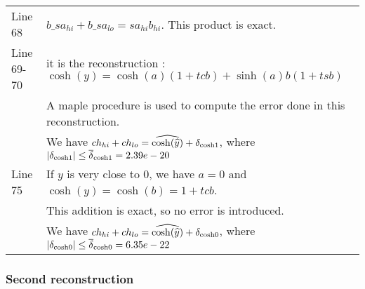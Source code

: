 \begin{tabular}{ll}
Line 68    & $b\_sa_{hi} + b\_sa_{lo} = sa_{hi}  b_{hi}$. This product is exact. \\
Line 69-70 & it is the reconstruction : $\cosh(y) = \cosh(a)(1+tcb) + \sinh(a)b(1+tsb)$ \\
           & A maple procedure is used to compute the error done in this reconstruction. \\
           & We have $ch_{hi}+ch_{lo} = \widehat{\cosh(\widehat{y})} + \delta_{\mathrm{cosh1}}$, where $|\delta_{\mathrm{cosh1}}| \leq {\overline{\delta}}_{\mathrm{cosh1}} = 2.39e-20$\\
Line 75    & If $y$ is very close to $0$, we have $a = 0$ and $\cosh(y) = \cosh(b) = 1 + tcb$. \\
           & This addition is exact, so no error is introduced. \\
           & We have $ch_{hi}+ch_{lo} = \widehat{\cosh(\widehat{y})} + \delta_{\mathrm{cosh0}}$, where $|\delta_{\mathrm{cosh0}}| \leq {\overline{\delta}}_{\mathrm{cosh0}} = 6.35e-22$\\
\end{tabular}


\subsubsection{Second reconstruction}

